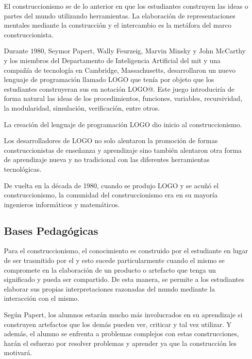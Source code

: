 El construccionismo se  de lo anterior en que los estudiantes
construyen las ideas o partes del mundo utilizando herramientas. La elaboración
de representaciones mentales mediante la construcción y el intercambio es la
metáfora del marco construccionista. 

Durante $1980$, Seymor Papert, Wally Feurzeig, Marvin Minsky y John McCarthy y los
miembros del Departamento de Inteligencia Artificial del \Gls{mit} y una
compañía de tecnología en Cambridge, Massachusetts, desarrollaron un nuevo
lenguaje de programación llamado LOGO que tenía por objeto que los estudiantes
construyeran sus  en notación LOGO@. Este juego
introduciría de forma natural las ideas de los procedimientos, funciones,
variables, recursividad, la modularidad, simulación, verificación, entre otros.

La creación del lenguaje de programación LOGO dio inicio al construccionismo.

Los desarrolladores de LOGO no solo alentaron la promoción de formas
construccionistas de enseñanza y aprendizaje sino también alentaron otra forma
de aprendizaje nueva y no tradicional con las diferentes herramientas tecnológicas. 

De vuelta en la década de 1980, cuando se produjo LOGO y se acuñó el
construccionismo, la comunidad del construccionismo era en su mayoría  ingenieros
informáticos y matemáticos\cite{historia:2014}.


\subsection{Bases Pedagógicas}

Para el construccionismo, el conocimiento es construido por el estudiante en
lugar de ser trasmitido por el \cite{moses:2003} y esto sucede particularmente cuando
el mismo se compromete en la elaboración de un producto o artefacto que tenga un
significado y pueda ser compartido\cite{valdivia:sg}. De esta manera, se permite
a los estudiantes elaborar sus propias interpretaciones razonadas del mundo
mediante la interacción con el mismo.

Según Papert, los alumnos estarán mucho más involucrados en su aprendizaje si
construyen artefactos que los demás pueden ver, criticar y tal vez utilizar. Y
además, el alumno se enfrenta a problemas complejos con estas construcciones,
harán el esfuerzo por resolver problemas y aprender ya que la construcción les
motivará\cite{const:vs}.

